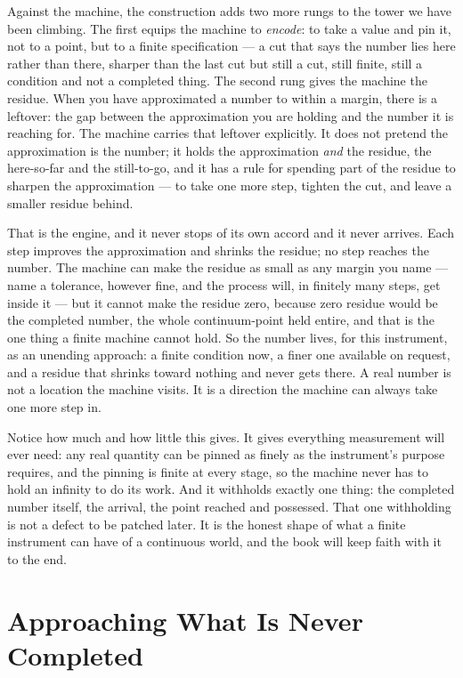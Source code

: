 Against the machine, the construction adds two more rungs to the tower we have been climbing. The first equips
the machine to \emph{encode}: to take a value and pin it, not to a point, but to a finite specification --- a
cut that says the number lies here rather than there, sharper than the last cut but still a cut, still finite,
still a condition and not a completed thing. The second rung gives the machine the residue. When you have
approximated a number to within a margin, there is a leftover: the gap between the approximation you are holding
and the number it is reaching for. The machine carries that leftover explicitly. It does not pretend the
approximation is the number; it holds the approximation \emph{and} the residue, the here-so-far and the
still-to-go, and it has a rule for spending part of the residue to sharpen the approximation --- to take one more
step, tighten the cut, and leave a smaller residue behind.

That is the engine, and it never stops of its own accord and it never arrives. Each step improves the
approximation and shrinks the residue; no step reaches the number. The machine can make the residue as small as
any margin you name --- name a tolerance, however fine, and the process will, in finitely many steps, get inside
it --- but it cannot make the residue zero, because zero residue would be the completed number, the whole
continuum-point held entire, and that is the one thing a finite machine cannot hold. So the number lives, for
this instrument, as an unending approach: a finite condition now, a finer one available on request, and a residue
that shrinks toward nothing and never gets there. A real number is not a location the machine visits. It is a
direction the machine can always take one more step in.

Notice how much and how little this gives. It gives everything measurement will ever need: any real quantity can
be pinned as finely as the instrument's purpose requires, and the pinning is finite at every stage, so the
machine never has to hold an infinity to do its work. And it withholds exactly one thing: the completed number
itself, the arrival, the point reached and possessed. That one withholding is not a defect to be patched later.
It is the honest shape of what a finite instrument can have of a continuous world, and the book will keep faith
with it to the end.

\section{Approaching What Is Never Completed}

